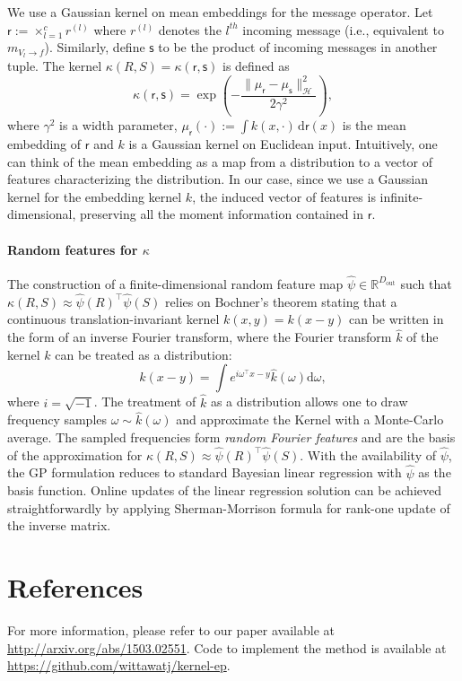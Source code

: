 \documentclass[a4paper,10pt]{article}
\begin{document}
We use a Gaussian kernel on mean embeddings for the message operator. Let 
$\mathsf{r}:= \times_{l=1}^c r^{(l)}$ where $r^{(l)}$ denotes the $l^{th}$
incoming message (i.e., equivalent to $m_{V_l \rightarrow f}$). Similarly,
define $\mathsf{s}$ to be the product of incoming messages in another tuple. 
The kernel $\kappa(R, S) = \kappa(\mathsf{r}, \mathsf{s})$ is defined as 
\begin{equation}
\kappa(\mathsf{r}, \mathsf{s}) =
\exp\left(-\frac{\|\mu_{\mathsf{r}}-\mu_{\mathsf{s}}\|_{\mathcal{H}}^{2}}{2\gamma^{2}}\right),
\label{eq:gauss_joint_emb}
\end{equation}
%
where $\gamma^2$ is a width parameter, $\mu_{\mathsf{r}}(\cdot) := \int
k(x, \cdot)\, \mathrm{d}\mathsf{r}(x)$ is the mean embedding of $\mathsf{r}$
and $k$ is a Gaussian kernel on Euclidean input.  Intuitively, one can think of
the mean embedding as a map from a distribution to a vector of features
characterizing the distribution. In our case, since we use 
a Gaussian kernel for the embedding kernel $k$, the induced vector of features is 
infinite-dimensional, preserving all the moment information contained in $\mathsf{r}$.


\paragraph{Random features for $\kappa$}
The construction of 
a finite-dimensional random feature map $\hat{\psi} \in \mathbb{R}^{D_\mathrm{out}}$ such that 
$\kappa(R, S) \approx \hat{\psi}(R)^\top \hat{\psi}(S)$ relies on Bochner's
theorem stating that a continuous translation-invariant kernel $k(x, y) = k(x-y)$ 
can be written in the form of an inverse Fourier transform, where the Fourier 
transform $\hat{k}$ of the kernel $k$ can be treated as a distribution:
%
\begin{equation}
    k(x-y) = \int e^{i\omega^\top x-y} \hat{k}(\omega) \mathrm{d}\omega ,
\end{equation}
where $i=\sqrt{-1}$. The treatment of $\hat{k}$ as a distribution allows one 
to draw frequency samples $\omega \sim \hat{k}(\omega)$ and approximate the Kernel 
with a Monte-Carlo average. The sampled frequencies form \emph{random Fourier features}
and are the basis of the approximation for  $\kappa(R, S) \approx \hat{\psi}(R)^\top \hat{\psi}(S)$.
With the availability of $\hat{\psi}$, the GP formulation reduces to standard Bayesian 
linear regression with $\hat{\psi}$ as the basis function. Online updates of the 
linear regression solution can be achieved straightforwardly by applying
Sherman-Morrison formula for rank-one update of the inverse matrix.


\section*{References}
For more information, please refer to our paper available at
\url{http://arxiv.org/abs/1503.02551}. Code to implement the method is available 
at \url{https://github.com/wittawatj/kernel-ep}.
\end{document}
